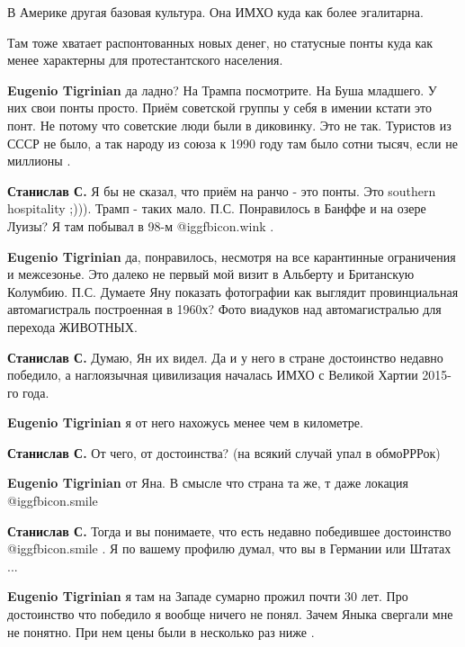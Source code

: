 \begin{itemize}

В Америке другая базовая культура. Она ИМХО куда как более эгалитарна.

Там тоже хватает распонтованных новых денег, но статусные понты куда как менее
характерны для протестантского населения.

\begin{itemize} %
\textbf{Eugenio Tigrinian} да ладно? На Трампа посмотрите. На Буша младшего.
У них свои понты просто.
Приём советской группы у себя в имении кстати это понт. Не потому что советские люди были в диковинку. Это не так. Туристов из СССР не было, а так народу из союза к 1990 году там было сотни тысяч, если не миллионы .

\textbf{Станислав С.}
Я бы не сказал, что приём на ранчо - это понты. Это southern hospitality ;))).
Трамп - таких мало.
П.С. Понравилось в Банффе и на озере Луизы?
Я там побывал в 98-м  @igg{fbicon.wink} .

\textbf{Eugenio Tigrinian} да, понравилось, несмотря на все карантинные ограничения и межсезонье. Это далеко не первый мой визит в Альберту и Британскую Колумбию.
П.С. Думаете Яну показать фотографии как выглядит провинциальная автомагистраль построенная в 1960х? Фото виадуков над автомагистралью для перехода ЖИВОТНЫХ.

\textbf{Станислав С.}
Думаю, Ян их видел.
Да и у него в стране достоинство недавно победило, а наглоязычная цивилизация началась ИМХО с Великой Хартии 2015-го года.

\textbf{Eugenio Tigrinian} я от него нахожусь менее чем в километре.

\textbf{Станислав С.}
От чего, от достоинства?
(на всякий случай упал в обмоРРРок)

\textbf{Eugenio Tigrinian} от Яна. В смысле что страна та же, т даже локация  @igg{fbicon.smile} 

\textbf{Станислав С.}
Тогда и вы понимаете, что есть недавно победившее достоинство  @igg{fbicon.smile} .
Я по вашему профилю думал, что вы в Германии или Штатах ...

\textbf{Eugenio Tigrinian} я там на Западе сумарно прожил почти 30 лет.
Про достоинство что победило я вообще ничего не понял.
Зачем Яныка свергали мне не понятно. При нем цены были в несколько раз ниже .


\end{itemize}
\end{itemize}
